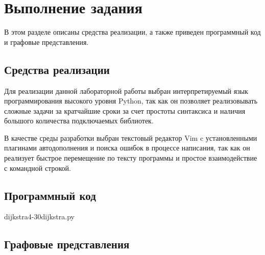 \chapter{Выполнение задания}

В этом разделе описаны средства реализации, а также приведен программный код и
графовые представления.

\section{Средства реализации}

Для реализации данной лабораторной работы выбран интерпретируемый язык
программирования высокого уровня Python\cite{python}, так как он позволяет
реализовывать сложные задачи за кратчайшие сроки за счет простоты синтаксиса и
наличия большого количества подключаемых библиотек. 

В качестве среды разработки выбран текстовый редактор Vim\cite{vim} c
установленными плагинами автодополнения и поиска ошибок в процессе написания,
так как он реализует быстрое перемещение по тексту программы и простое
взаимодействие с командной строкой.

\section{Программный код}

          {dijkstra}{4-30}{dijkstra.py}

\section{Графовые представления}
